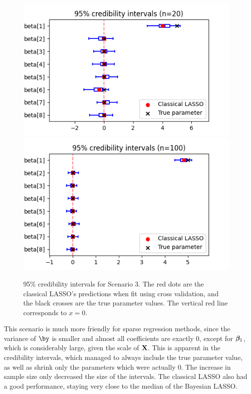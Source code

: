 \documentclass[a4paper, 10pt]{article}
\begin{document}
\begin{figure}[htb]
    \begin{center}
        \includegraphics[width=.6\textwidth]{../outputs/artificial_scenarios_n=20/scenario_3/credibility_intervals.png}
        \vspace{1cm}
        \includegraphics[width=.6\textwidth]{../outputs/artificial_scenarios_n=100/scenario_3/credibility_intervals.png}
    \end{center}
    \caption[95\% credibility intervals for Scenario 3.]{95\% credibility intervals for Scenario 3. The red dots are the classical LASSO's predictions when fit using cross validation, and the black crosses are the true parameter values. The vertical red line corresponds to $ x = 0 $.}
    \label{fig: credibility intervals scenario 3}
\end{figure}

This scenario is much more friendly for sparse regression methods, since the variance of $ \by $ is smaller and almost all coefficients are exactly $ 0 $, except for $ \boldsymbol{\beta}_{ 1 } $, which is considerably large, given the scale of $ \mathbf{X} $.
This is apparent in the credibility intervals, which managed to always include the true parameter value, as well as shrink only the parameters which were actually $ 0 $.
The increase in sample size only decreased the size of the intervals.
The classical LASSO also had a good performance, staying very close to the median of the Bayesian LASSO.
\end{document}
